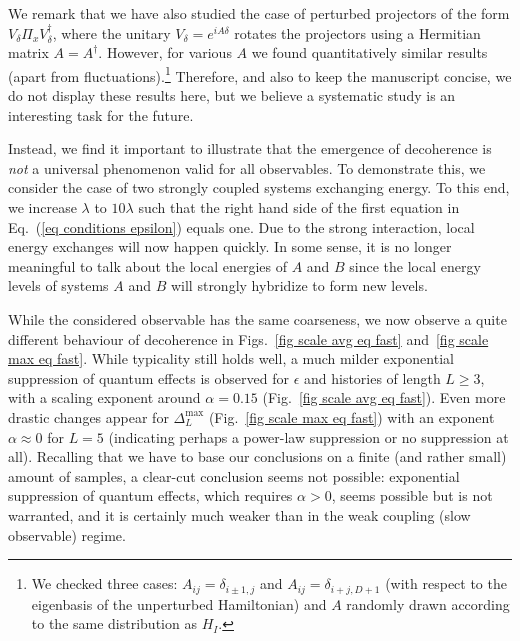 \documentclass[pre,onecolumn,12pt,aps,longbibliography,nofootinbib]{revtex4-2}
\newcommand{\blue}[1]{#1}
\newcommand{\new}[1]{#1}
\begin{document}
\new{We remark that we have also studied the case of perturbed projectors of the form $V_\delta \Pi_x V_\delta^\dagger$, where the unitary $V_\delta = e^{iA\delta}$ rotates the projectors using a Hermitian matrix $A = A^\dagger$. However, for various $A$ we found quantitatively similar results (apart from fluctuations).\footnote{\new{We checked three cases: $A_{ij} = \delta_{i\pm1,j}$ and $A_{ij} = \delta_{i+j,D+1}$ (with respect to the eigenbasis of the unperturbed Hamiltonian) and $A$ randomly drawn according to the same distribution as $H_I$.}} Therefore, and also to keep the manuscript concise, we do not display these results here, but we believe a systematic study is an interesting task for the future.}

\new{Instead, we find it important to illustrate that} the emergence of \new{decoherence} is \emph{not} a universal phenomenon valid for all observables. To demonstrate this, we consider the case of two strongly coupled systems exchanging energy. To this end, we increase $\lambda$ to $10\lambda$ such that the right hand side of the first equation in Eq.~(\ref{eq conditions epsilon}) equals one. Due to the strong interaction, local energy exchanges will now happen quickly. In some sense, it is no longer meaningful to talk about the local energies of $A$ and $B$ since the local energy levels of systems $A$ and $B$ will strongly hybridize to form new levels.

\blue{While the considered observable has the same coarseness, we now observe a quite} different behaviour of \new{decoherence} in Figs.~\ref{fig scale avg eq fast} and~\ref{fig scale max eq fast}. While typicality still holds well, \blue{a much milder exponential suppression of quantum effects is observed for $\epsilon$ and} histories of length $L\ge3$, \blue{with a} scaling exponent around $\alpha = 0.15$ (Fig.~\ref{fig scale avg eq fast}). \blue{Even more drastic changes appear for $\Delta_L^\text{max}$ (Fig.~\ref{fig scale max eq fast}) with an exponent $\alpha\approx 0$ for $L=5$ (indicating perhaps a power-law suppression or no suppression at all)}. Recalling that we have to base our conclusions on a finite (and rather small) amount of samples, a clear-cut conclusion seems not possible: exponential suppression of quantum effects, which requires $\alpha>0$, seems possible but is not warranted, and it is certainly much weaker than in the weak coupling (slow observable) regime.
\end{document}

